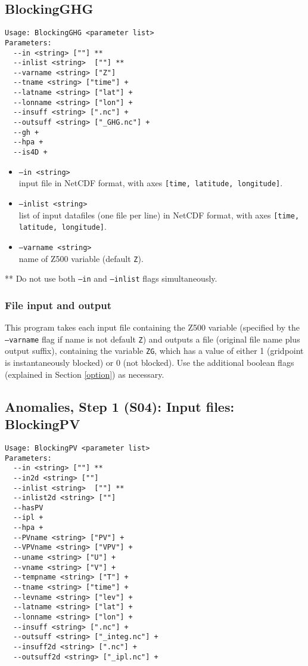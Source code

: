 \documentclass{article}
\begin{document}
\subsection{BlockingGHG}\label{ghg}

\begin{verbatim}
Usage: BlockingGHG <parameter list>
Parameters:
  --in <string> [""] **
  --inlist <string>  [""] **
  --varname <string> ["Z"]
  --tname <string> ["time"] +
  --latname <string> ["lat"] +
  --lonname <string> ["lon"] +
  --insuff <string> [".nc"] +
  --outsuff <string> ["_GHG.nc"] +
  --gh +
  --hpa +
  --is4D +
\end{verbatim}

\begin{itemize}
\item[]\texttt{--in <string>} \\ input file in NetCDF format, with axes \texttt{[time, latitude, longitude]}. 
\item[]\texttt{--inlist <string>}\\ list of input datafiles (one file per line) in NetCDF format, with axes \texttt{[time, latitude, longitude]}. 
\item[] \texttt{--varname <string>}\\ name of Z500 variable (default \texttt{Z}).
\end{itemize}

** Do not use both \texttt{--in} and \texttt{--inlist} flags simultaneously.


\subsubsection{File input and output}


This program takes each input file containing the Z500 variable (specified by the \texttt{--varname} flag if name is not default \texttt{Z}) and outputs a file (original file name plus output suffix), containing the variable \texttt{ZG}, which has a value of either 1 (gridpoint is instantaneously blocked) or 0 (not blocked). Use the additional boolean flags (explained in Section \ref{option}) as necessary.





\subsection{Anomalies, Step 1 (S04): Input files: BlockingPV}\label{PV}
\begin{verbatim}
Usage: BlockingPV <parameter list>
Parameters:
  --in <string> [""] **
  --in2d <string> [""] 
  --inlist <string>  [""] **
  --inlist2d <string> [""] 
  --hasPV
  --ipl +
  --hpa +
  --PVname <string> ["PV"] +
  --VPVname <string> ["VPV"] +
  --uname <string> ["U"] +
  --vname <string> ["V"] +
  --tempname <string> ["T"] +
  --tname <string> ["time"] +
  --levname <string> ["lev"] +
  --latname <string> ["lat"] +
  --lonname <string> ["lon"] +
  --insuff <string> [".nc"] +
  --outsuff <string> ["_integ.nc"] +
  --insuff2d <string> [".nc"] +
  --outsuff2d <string> ["_ipl.nc"] +
\end{verbatim}
\end{document}
